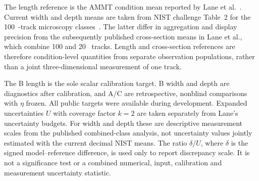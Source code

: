 The length reference is the AMMT condition mean reported by Lane et al.~\cite{lane2020}. Current width and depth means are taken from NIST challenge Table~2 for the 100~\us-track microscopy classes~\cite{nist2018}. The latter differ in aggregation and display precision from the subsequently published cross-section means in Lane et al., which combine 100 and 20~\us{} tracks. Length and cross-section references are therefore condition-level quantities from separate observation populations, rather than a joint three-dimensional measurement of one track.

The B length is the sole scalar calibration target. B width and depth are diagnostics after calibration, and A/C are retrospective, nonblind comparisons with $\eta$ frozen. All public targets were available during development. Expanded uncertainties $U$ with coverage factor $k=2$ are taken separately from Lane's uncertainty budgets. For width and depth these are descriptive measurement scales from the published combined-class analysis, not uncertainty values jointly estimated with the current decimal NIST means. The ratio $\delta/U$, where $\delta$ is the signed model--reference difference, is used only to report discrepancy scale. It is not a significance test or a combined numerical, input, calibration and measurement uncertainty statistic.

